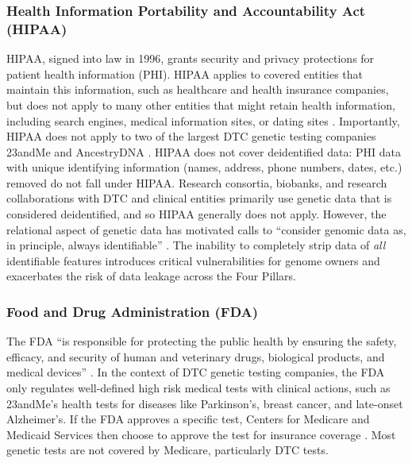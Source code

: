 \subsubsection{Health Information Portability and Accountability Act (HIPAA)} HIPAA, signed into law in 1996, grants security and privacy protections for patient health information (PHI). 
HIPAA applies to covered entities that maintain this information, such as healthcare and health insurance companies, but does not apply to many other entities that might retain health information, including search engines, medical information sites, or dating sites \cite{citron_new_2020}. Importantly, HIPAA does not apply to two of the largest DTC genetic testing companies 23andMe and AncestryDNA \cite{sklar_be_2020}. HIPAA does not cover deidentified data: PHI data with unique identifying information (names, address, phone numbers, dates, etc.) removed do not fall under HIPAA. Research consortia, biobanks, and research collaborations with DTC and clinical entities primarily use genetic data that is considered deidentified, and so HIPAA generally does not apply. However, the relational aspect of genetic data has motivated calls to ``consider genomic data as, in principle, always identifiable'' \cite{bonomi_privacy_2020}. The inability to completely strip data of \emph{all} identifiable features introduces critical vulnerabilities for genome owners and exacerbates the risk of data leakage across the Four Pillars.


\subsubsection{Food and Drug Administration (FDA)}
The FDA ``is responsible for protecting the public health by ensuring the safety, efficacy, and security of human and veterinary drugs, biological products, and medical devices'' \cite{commissioner_what_2023}. In the context of DTC genetic testing companies, the FDA only regulates well-defined high risk medical tests with clinical actions, such as 23andMe's health tests for diseases like Parkinson's, breast cancer, and late-onset Alzheimer's. If the FDA approves a specific test, Centers for Medicare and Medicaid Services then choose to approve the test for insurance coverage \cite{daval_authority_2023}. Most genetic tests are not covered by Medicare, particularly DTC tests. 

